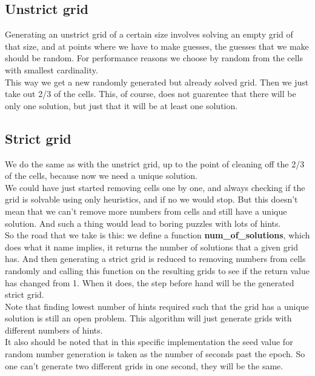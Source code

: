 \documentclass[english,a4paper]{article}
\begin{document}
\subsection{Unstrict grid}

Generating an unstrict grid of a certain size involves solving an
empty grid of that size, and at points where we have to make guesses,
the guesses that we make should be random. For performance reasons we
choose by random from the cells with smallest cardinality.\\

This way we get a new randomly generated but already solved grid. Then
we just take out 2/3 of the cells. This, of course, does not guarentee
that there will be only one solution, but just that it will be at
least one solution.\\

\subsection{Strict grid}

We do the same as with the unstrict grid, up to the point of cleaning
off the 2/3 of the cells, because now we need a unique solution.\\

We could have just started removing cells one by one, and always
checking if the grid is solvable using only heuristics, and if no we
would stop. But this doesn't mean that we can't remove more numbers
from cells and still have a unique solution. And such a thing would
lead to boring puzzles with lots of hints.\\

So the road that we take is this: we define a function
\textbf{num\_of\_solutions}, which does what it name implies, it returns
the number of solutions that a given grid has. And then generating a
strict grid is reduced to removing numbers from cells randomly and
calling this function on the resulting grids to see if the return
value has changed from 1. When it does, the step before hand will be
the generated strict grid.\\

Note that finding lowest number of hints required such that the grid
has a unique solution is still an open problem. This algorithm will
just generate grids with different numbers of hints.\\

It also should be noted that in this specific implementation the seed
value for random number generation is taken as the number of seconds
past the epoch. So one can't generate two different grids in one
second, they will be the same.
\end{document}
